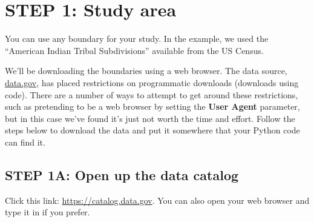 \documentclass[
  letterpaper,
  DIV=11,
  numbers=noendperiod,
  oneside]{scrreprt}
\begin{document}

\chapter{STEP 1: Study area}\label{step-1-study-area}

You can use any boundary for your study. In the example, we used the
``American Indian Tribal Subdivisions'' available from the US Census.


We'll be downloading the boundaries using a web browser. The data
source, \href{https://catalog.data.gov/}{data.gov}, has placed
restrictions on programmatic downloads (downloads using code). There are
a number of ways to attempt to get around these restrictions, such as
pretending to be a web browser by setting the \textbf{User Agent}
parameter, but in this case we've found it's just not worth the time and
effort. Follow the steps below to download the data and put it somewhere
that your Python code can find it.

\section{STEP 1A: Open up the data
catalog}\label{step-1a-open-up-the-data-catalog}

Click this link:
\href{https://catalog.data.gov/}{https://catalog.data.gov}. You can also
open your web browser and type it in if you prefer.
\end{document}
